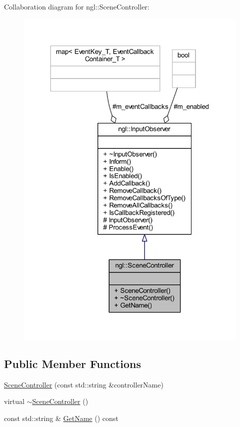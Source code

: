 Collaboration diagram for ngl\+:\+:Scene\+Controller\+:
\nopagebreak
\begin{figure}[H]
\begin{center}
\leavevmode
\includegraphics[width=318pt]{classngl_1_1_scene_controller__coll__graph}
\end{center}
\end{figure}
\subsection*{Public Member Functions}
\begin{DoxyCompactItemize}
\item 
\mbox{\hyperlink{classngl_1_1_scene_controller_a0c1770f5d2dffd2e74f5185699dd4eaa}{Scene\+Controller}} (const std\+::string \&controller\+Name)
\item 
virtual \mbox{\hyperlink{classngl_1_1_scene_controller_a70506f42f0924a647a10ef7c4a945a6c}{$\sim$\+Scene\+Controller}} ()
\item 
const std\+::string \& \mbox{\hyperlink{classngl_1_1_scene_controller_ad20a9bc754a25ced782e272a195f7dc9}{Get\+Name}} () const
\end{DoxyCompactItemize}
